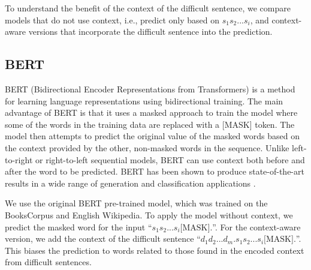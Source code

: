 \documentclass[11pt,a4paper]{article}
\begin{document}
To understand the benefit of the context of the difficult sentence, we compare models that do not use context, i.e., predict only based on $s_1 s_2 ... s_i$, and context-aware versions that incorporate the difficult sentence into the prediction.



\subsection{BERT}


BERT (Bidirectional Encoder Representations from Transformers) is a method for learning language representations using bidirectional training.  The main advantage of BERT is that it uses a masked approach to train the model where some of the words in the training data are replaced with a [MASK] token. The model then attempts to predict the original value of the masked words based on the context provided by the other, non-masked words in the sequence.  Unlike left-to-right or right-to-left sequential models, BERT can use context both before and after the word to be predicted.  BERT has been shown to produce state-of-the-art results in a wide range of generation and classification applications \cite{devlin2018bert}.

We use the original BERT pre-trained model, which was trained on the BooksCorpus \cite{zhu2015aligning} and English Wikipedia. To apply the model without context, we predict the masked word for the input ``$s_1 s_2 ... s_i \mbox{[MASK]} .$''. For the context-aware version, we add the context of the difficult sentence
``$d_1 d_2 ... d_m. s_1 s_2 ... s_i \mbox{[MASK]} .$''. This biases the prediction to words related to those found in the encoded context from difficult sentences.
\end{document}
